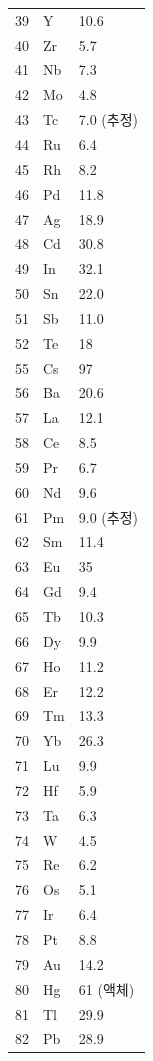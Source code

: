 \documentclass[12pt,a4paper]{article}
\begin{document}
\begin{longtable}{p{0.6cm}p{1.2cm}p{1.5cm}}
		39 & Y  & 10.6 \\
		40 & Zr & 5.7 \\
		41 & Nb & 7.3 \\
		42 & Mo & 4.8 \\
		43 & Tc & 7.0 (추정) \\
		44 & Ru & 6.4 \\
		45 & Rh & 8.2 \\
		46 & Pd & 11.8 \\
		47 & Ag & 18.9 \\
		48 & Cd & 30.8 \\
		49 & In & 32.1 \\
		50 & Sn & 22.0 \\
		51 & Sb & 11.0 \\
		52 & Te & 18 \\
		55 & Cs & 97 \\
		56 & Ba & 20.6 \\
		57 & La & 12.1 \\
		58 & Ce & 8.5 \\
		59 & Pr & 6.7 \\
		60 & Nd & 9.6 \\
		61 & Pm & 9.0 (추정) \\
		62 & Sm & 11.4 \\
		63 & Eu & 35 \\
		64 & Gd & 9.4 \\
		65 & Tb & 10.3 \\
		66 & Dy & 9.9 \\
		67 & Ho & 11.2 \\
		68 & Er & 12.2 \\
		69 & Tm & 13.3 \\
		70 & Yb & 26.3 \\
		71 & Lu & 9.9 \\
		72 & Hf & 5.9 \\
		73 & Ta & 6.3 \\
		74 & W  & 4.5 \\
		75 & Re & 6.2 \\
		76 & Os & 5.1 \\
		77 & Ir & 6.4 \\
		78 & Pt & 8.8 \\
		79 & Au & 14.2 \\
		80 & Hg & 61 (액체) \\
		81 & Tl & 29.9 \\
		82 & Pb & 28.9 \\
	\end{longtable}
	
\end{document}
